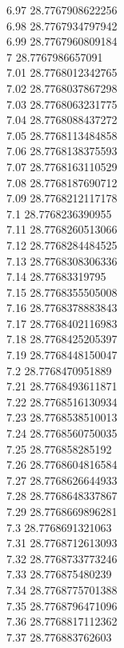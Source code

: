 {6.97	28.7767908622256\\
6.98	28.7767934797942\\
6.99	28.7767960809184\\
7	28.7767986657091\\
7.01	28.7768012342765\\
7.02	28.7768037867298\\
7.03	28.7768063231775\\
7.04	28.7768088437272\\
7.05	28.7768113484858\\
7.06	28.7768138375593\\
7.07	28.7768163110529\\
7.08	28.7768187690712\\
7.09	28.7768212117178\\
7.1	28.7768236390955\\
7.11	28.7768260513066\\
7.12	28.7768284484525\\
7.13	28.7768308306336\\
7.14	28.77683319795\\
7.15	28.7768355505008\\
7.16	28.7768378883843\\
7.17	28.7768402116983\\
7.18	28.7768425205397\\
7.19	28.7768448150047\\
7.2	28.7768470951889\\
7.21	28.7768493611871\\
7.22	28.7768516130934\\
7.23	28.7768538510013\\
7.24	28.7768560750035\\
7.25	28.776858285192\\
7.26	28.7768604816584\\
7.27	28.7768626644933\\
7.28	28.7768648337867\\
7.29	28.7768669896281\\
7.3	28.7768691321063\\
7.31	28.7768712613093\\
7.32	28.7768733773246\\
7.33	28.776875480239\\
7.34	28.7768775701388\\
7.35	28.7768796471096\\
7.36	28.7768817112362\\
7.37	28.776883762603\\
}
